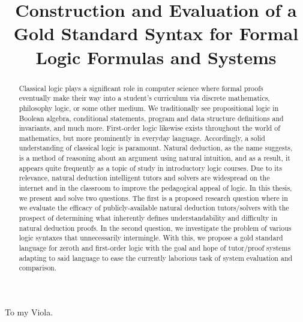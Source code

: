 \documentclass[ms]{uncgdissertationexp2}
\title{Construction and Evaluation of a Gold Standard Syntax for Formal Logic Formulas and Systems}
\theoremstyle{plain}
\theoremstyle{definition}
\theoremstyle{remark}
\begin{document}
\frontmatter      %
\begin{abstract}
	Classical logic plays a significant role in computer science where formal proofs eventually make their way into a student's curriculum via discrete mathematics, philosophy logic, or some other medium. We traditionally see propositional logic in Boolean algebra, conditional statements, program and data structure definitions and invariants, and much more. First-order logic likewise exists throughout the world of mathematics, but more prominently in everyday language. Accordingly, a solid understanding of classical logic is paramount. Natural deduction, as the name suggests, is a method of reasoning about an argument using natural intuition, and as a result, it appears quite frequently as a topic of study in introductory logic courses. Due to its relevance, natural deduction intelligent tutors and solvers are widespread on the internet and in the classroom to improve the pedagogical appeal of logic. In this thesis, we present and solve two questions. The first is a proposed research question where in we evaluate the efficacy of publicly-available natural deduction tutors/solvers with the prospect of determining what inherently defines understandability and difficulty in natural deduction proofs. In the second question, we investigate the problem of various logic syntaxes that unnecessarily intermingle. With this, we propose a gold standard language for zeroth and first-order logic with the goal and hope of tutor/proof systems adapting to said language to ease the currently laborious task of system evaluation and comparison. 
\end{abstract}

\maketitlepage

\makecopyrightpage

\begin{dedication}
	To my Viola.
\end{dedication}

\makeapprovalpage
\end{document}
